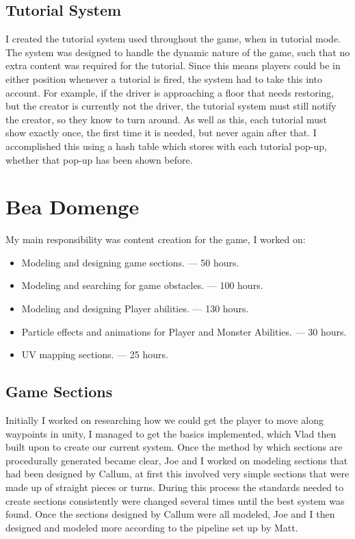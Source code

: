 \documentclass[a4paper,oneside]{memoir}
\begin{document}
			\subsection{Tutorial System}

				I created the tutorial system used throughout the game, when in tutorial mode. 
				The system was designed to handle the dynamic nature of the game, such that no extra content was required for the tutorial.
				Since this means players could be in either position whenever a tutorial is fired, the system had to take this into account.
				For example, if the driver is approaching a floor that needs restoring, but the creator is currently not the driver, the tutorial system must still notify the creator, so they know to turn around.
				As well as this, each tutorial must show exactly once, the first time it is needed, but never again after that.
				I accomplished this using a hash table which stores with each tutorial pop-up, whether that pop-up has been shown before.

		\section{Bea Domenge}
			My main responsibility was content creation for the game, I worked on:

				\begin{itemize}
					\item Modeling and designing game sections. --- 50 hours.
					\item Modeling and searching for game obstacles. --- 100 hours. 
					\item Modeling and designing Player abilities. --- 130 hours.
					\item Particle effects and animations for Player and Monster Abilities. --- 30 hours.
					\item UV mapping sections. --- 25 hours.
				\end{itemize}

			\subsection{Game Sections}
				Initially I worked on researching how we could get the player to move along waypoints in unity, I managed to get the basics implemented, which Vlad then built upon to create our current system.
				Once the method by which sections are procedurally generated became clear, Joe and I worked on modeling sections that had been designed by Callum, at first this involved very simple sections that were made up of straight pieces or turns. During this process the standards needed to create sections consistently were changed several times until the best system was found. Once the sections designed by Callum were all modeled, Joe and I then designed and modeled more according to the pipeline set up by Matt.
\end{document}
